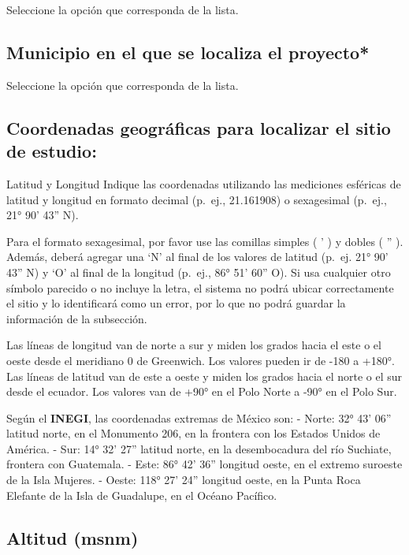 \documentclass[
]{book}
\begin{document}
Seleccione la opción que corresponda de la lista.

\hypertarget{municipio-en-el-que-se-localiza-el-proyecto}{%
\subsection{Municipio en el que se localiza el proyecto*}\label{municipio-en-el-que-se-localiza-el-proyecto}}

Seleccione la opción que corresponda de la lista.

\hypertarget{coordenadas-geogruxe1ficas-para-localizar-el-sitio-de-estudio}{%
\subsection{Coordenadas geográficas para localizar el sitio de estudio:}\label{coordenadas-geogruxe1ficas-para-localizar-el-sitio-de-estudio}}

Latitud y Longitud
Indique las coordenadas utilizando las mediciones esféricas de latitud y longitud en formato decimal (p.~ej., 21.161908) o sexagesimal (p.~ej., 21° 90' 43'' N).

Para el formato sexagesimal, por favor use las comillas simples ( ' ) y dobles ( '' ). Además, deberá agregar una `N' al final de los valores de latitud (p.~ej. 21° 90' 43'' N) y `O' al final de la longitud (p.~ej., 86° 51' 60'' O). Si usa cualquier otro símbolo parecido o no incluye la letra, el sistema no podrá ubicar correctamente el sitio y lo identificará como un error, por lo que no podrá guardar la información de la subsección.

Las líneas de longitud van de norte a sur y miden los grados hacia el este o el oeste desde el meridiano 0 de Greenwich. Los valores pueden ir de -180 a +180°. Las líneas de latitud van de este a oeste y miden los grados hacia el norte o el sur desde el ecuador. Los valores van de +90° en el Polo Norte a -90° en el Polo Sur.

Según el \textbf{INEGI}, las coordenadas extremas de México son:
- Norte: 32° 43' 06'' latitud norte, en el Monumento 206, en la frontera con los Estados Unidos de América.
- Sur: 14° 32' 27'' latitud norte, en la desembocadura del río Suchiate, frontera con Guatemala.
- Este: 86° 42' 36'' longitud oeste, en el extremo suroeste de la Isla Mujeres.
- Oeste: 118° 27' 24'' longitud oeste, en la Punta Roca Elefante de la Isla de Guadalupe, en el Océano Pacífico.

\hypertarget{altitud-msnm}{%
\subsection{Altitud (msnm)}\label{altitud-msnm}}
\end{document}
